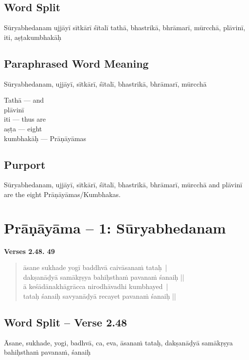\subsection*{Word Split}

Sūryabhedanam ujjāyī sītkārī śītalī tathā, bhastrikā, bhrāmarī, mūrcchā, plāvinī, iti, aṣṭakumbhakāḥ

\subsection*{Paraphrased Word Meaning}


Sūryabhedanam, ujjāyī, sītkārī, śītalī, bhastrikā, bhrāmarī, mūrcchā

\begin{multicols}{2}
Tathā --- and \\
plāvinī  \\
iti  --- thus are \\
aṣṭa --- eight \\
kumbhakāḥ --- Prāṇāyāmas 
\end{multicols}

\subsection*{Purport}

Sūryabhedanam, ujjāyī, sītkārī, śītalī, bhastrikā, bhrāmarī, mūrcchā and plāvinī are the eight Prāṇāyāmas/Kumbhakas.	
\newpage

\section*{Prāṇāyāma -- 1: Sūryabhedanam}

\noindent \textbf{Verses 2.48. 49}

\begin{verse}
āsane sukhade yogī baddhvā caivāsanaṁ tataḥ |\\
dakṣanāḍyā samākṛṣya bahiḥsthaṁ pavanaṁ śanaiḥ ||\\
ā keśādānakhāgrācca nirodhāvadhi kumbhayed |\\
tataḥ śanaiḥ savyanāḍyā recayet pavanaṁ śanaiḥ ||
\end{verse}

\subsection*{Word Split -- Verse 2.48}


Āsane, sukhade, yogi, badhvā, ca, eva, āsanaṁ tataḥ, dakṣanāḍyā samākṛṣya bahiḥsthaṁ pavanaṁ, śanaiḥ

